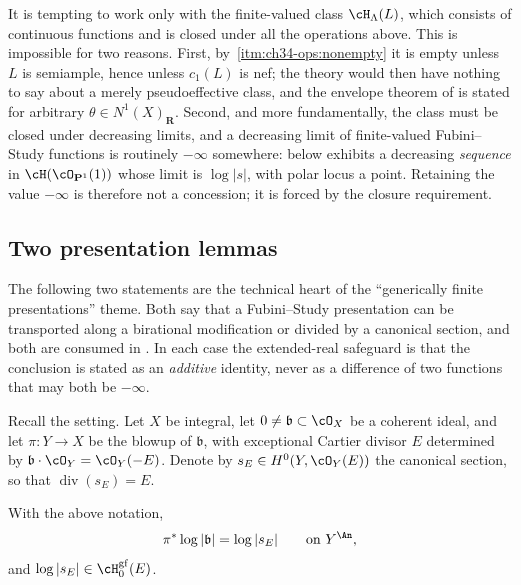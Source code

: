 \begin{remark}
\label{rem:ch34-why-gf}
It is tempting to work only with the finite-valued class $\cH_\Lambda(L)$,
which consists of continuous functions and is closed under all the
operations above.  This is impossible for two reasons.  First, by
\,\cref{itm:ch34-ops:nonempty} it is empty
unless $L$ is semiample, hence unless $c_1(L)$ is nef; the theory would
then have nothing to say about a merely pseudoeffective class, and the
envelope theorem of  is stated for
arbitrary $\theta\in N^1(X)_{\mathbf R}$.  Second, and more fundamentally,
the class must be closed under decreasing limits, and a decreasing limit of
finite-valued Fubini--Study functions is routinely $-\infty$ somewhere:
 below exhibits a decreasing
\emph{sequence} in $\cH(\cO_{\mathbf P^1}(1))$ whose limit is
$\log|s|$, with polar locus a point.  Retaining the value $-\infty$ is
therefore not a concession; it is forced by the closure requirement.
\end{remark}

\subsection{Two presentation lemmas}

The following two statements are the technical heart of the
``generically finite presentations'' theme.  Both say that a Fubini--Study
presentation can be transported along a birational modification or divided
by a canonical section, and both are consumed in
.  In each case
the extended-real safeguard is that the conclusion is stated as an
\emph{additive} identity, never as a difference of two functions that may
both be $-\infty$.

Recall the setting.  Let $X$ be integral, let
$0\ne\mathfrak b\subset\cO_X$ be a coherent ideal, and let
$\pi:Y\to X$ be the blowup of $\mathfrak b$, with exceptional Cartier
divisor $E$ determined by
$\mathfrak b\cdot\cO_Y=\cO_Y(-E)$.  Denote by
$s_E\in H^0(Y,\cO_Y(E))$ the canonical section, so that
$\operatorname{div}(s_E)=E$.

\begin{lemma}
\label{lem:ch34-exceptional-section}
With the above notation,
\begin{equation}
\label{eq:ch34-exceptional-section}
 \pi^*\log|\mathfrak b|=\log|s_E|
 \qquad\text{on }Y^{\An},
\end{equation}
and $\log|s_E|\in\cH^{\mathrm{gf}}_0(E)$.
\end{lemma}


